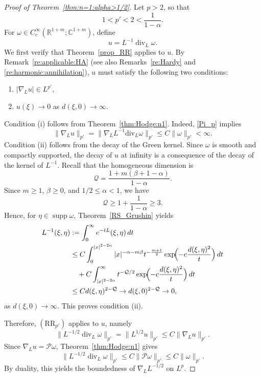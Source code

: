 \documentclass[12pt]{amsart}
\begin{document}
\begin{proof}[Proof of Theorem~\ref{thm:n=1:alpha>1/2}]
Let $p>2$, so that
\begin{equation*}
    1<p'<2<\frac{1}{1-\alpha}.
\end{equation*}
For $\omega\in C_c^\infty(\mathbb R^{1+m};\mathbb C^{1+m})$, define
\begin{equation*}
    u=L^{-1}\operatorname{div}_L \omega.
\end{equation*}
We first verify that Theorem~\ref{prop_RR} applies to $u$. By Remark~\ref{re:applicable:HA} (see also Remarks~\ref{re:Hardy} and \ref{re:harmonic:annihilation}), $u$ must satisfy the following two conditions:
\begin{enumerate}[label=(\roman*)]
    \item $|\nabla_L u|\in L^{p'}$,
    \item $u(\xi) \to 0$ as $d(\xi,0)\to \infty$.
\end{enumerate}
Condition (i) follows from Theorem~\ref{thm:Hodge:n1}. Indeed, \eqref{Pi_p} implies
\begin{equation*}
    \|\nabla_L u\|_{p'} = \| \nabla_L L^{-1} \mathrm{div}_L \omega\|_{p'}\le C \|\omega\|_{p'} <\infty.
\end{equation*}
Condition (ii) follows from the decay of the Green kernel. Since $\omega$ is smooth and compactly supported, the decay of $u$ at infinity is a consequence of the decay of the kernel of $L^{-1}$. Recall that the homogeneous dimension is
\begin{equation*}
    \mathcal{Q}=\frac{1+m(\beta+1-\alpha)}{1-\alpha}.
\end{equation*}
Since $m\ge1$, $\beta\ge 0$, and $1/2\le\alpha<1$, we have
\begin{equation*}
    \mathcal{Q}\ge 1+\frac{1}{1-\alpha}\ge3.
\end{equation*}
Hence, for $\eta \in \operatorname{supp} \omega$, Theorem~\ref{RS_Grushin} yields
\begin{align*}
L^{-1}(\xi,\eta)
&:=\int_0^\infty e^{-tL}(\xi,\eta) \, dt\\
&\le C\int_0^{|x|^{2-2\alpha}} |x|^{-\alpha-m\beta} t^{-\frac{m+1}{2}} \exp\!\Bigl(-c\frac{d(\xi,\eta)^2}{t}\Bigr)\,dt \\
&\quad + C\int_{|x|^{2-2\alpha}}^\infty t^{-\mathcal{Q}/2} \exp\!\Bigl(-c\frac{d(\xi,\eta)^2}{t}\Bigr)\,dt \\
&\le C d(\xi,\eta)^{2-\mathcal{Q}}
    \to d(\xi,0)^{2-\mathcal{Q}}
    \to 0,
\end{align*}
as $d(\xi,0)\to \infty$. This proves condition (ii).

Therefore, $(\mathrm{RR}_{p'})$ applies to $u$, namely
\begin{equation*}
   \|L^{-1/2}\operatorname{div}_L\omega\|_{p'} = \| L^{1/2} u\|_{p'} \le C \| \nabla_L u\|_{p'}.
\end{equation*}
Since $\nabla_L u=\mathcal P\omega$, Theorem~\ref{thm:Hodge:n1} gives
\begin{equation*}
\|L^{-1/2}\operatorname{div}_L\omega\|_{p'} \le C\|\mathcal P\omega\|_{p'} \le
C\|\omega\|_{p'}.
\end{equation*}
By duality, this yields the boundedness of $\nabla_L L^{-1/2}$ on $L^p$.
\end{proof}
\end{document}

